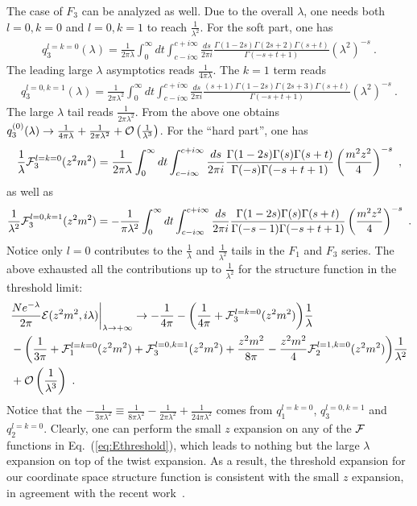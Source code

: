 \documentclass[a4paper,11pt]{article}
\begin{document}
The case of $F_3$ can be analyzed as well. Due to the overall $\lambda$, one needs both $l=0,k=0$ and $l=0,k=1$ to reach $\frac{1}{\lambda^2}$.  For the soft part, one has
\begin{align}
q_3^{l=k=0}(\lambda)=\frac{1}{2\pi\lambda}\int_{0}^{\infty} dt \int_{c-i\infty}^{c+i\infty} \frac{ds}{2\pi i}\frac{\Gamma (1-2 s)  \Gamma(2s+2)\Gamma (s+t)}{\Gamma (-s+t+1)}\left(\lambda^2\right)^{-s} \ .
\end{align}
The leading large $\lambda$ asymptotics reads $\frac{1}{4\pi \lambda}$. The $k=1$ term reads
\begin{align}
q_3^{l=0,k=1}(\lambda)=\frac{1}{2\pi\lambda^2}\int_{0}^{\infty} dt \int_{c-i\infty}^{c+i\infty} \frac{ds}{2\pi i}\frac{(s+1)\Gamma (1-2 s)  \Gamma(2s+3)\Gamma (s+t)}{\Gamma (-s+t+1)}\left(\lambda^2\right)^{-s} \ .
\end{align}
The large $\lambda$ tail reads $\frac{1}{2\pi \lambda^2}$. From the above one obtains $q_3^{(0)}(\lambda) \rightarrow \frac{1}{4\pi \lambda}+\frac{1}{2\pi \lambda^2}+{\cal O}\left(\frac{1}{\lambda^3}\right)$. 
For the ``hard part'', one has
\begin{align}
\frac{1}{\lambda}{\cal F}_3^{l=k=0}(z^2m^2)=\frac{1}{2\pi\lambda}\int_{0}^{\infty} dt \int_{c-i\infty}^{c+i\infty} \frac{ds}{2\pi i}\frac{\Gamma (1-2 s) \Gamma (s) \Gamma (s+t)}{\Gamma (-s) \Gamma (-s+t+1)}\left(\frac{m^2 z^2}{4}\right)^{-s} \ ,
\end{align}
as well as
\begin{align}
\frac{1}{\lambda^2}{\cal F}_3^{l=0,k=1}(z^2m^2)=-\frac{1}{\pi\lambda^2}\int_{0}^{\infty} dt \int_{c-i\infty}^{c+i\infty} \frac{ds}{2\pi i}\frac{\Gamma (1-2 s) \Gamma (s) \Gamma (s+t)}{\Gamma (-s-1) \Gamma (-s+t+1)}\left(\frac{m^2 z^2}{4}\right)^{-s} \ .
\end{align}
Notice only $l=0$ contributes to the $\frac{1}{\lambda}$ and $\frac{1}{\lambda^2}$ tails in the $F_1$ and $F_3$ series. The above exhausted all the contributions up to $\frac{1}{\lambda^2}$ for the structure function in the threshold limit: 
\begin{align}\label{eq:Ethreshold}
&\frac{Ne^{-\lambda}}{2\pi}{\cal E}(z^2m^2,i\lambda)\bigg|_{\lambda \rightarrow +\infty} \rightarrow -\frac{1}{4\pi}-\bigg(\frac{1}{4\pi}+{\cal F}^{l=k=0}_3(z^2m^2)\bigg)\frac{1}{\lambda}\nonumber \\ 
&-\bigg(\frac{1}{3\pi}+{\cal F}_1^{l=k=0}(z^2m^2)+{\cal F}_3^{l=0,k=1}(z^2m^2)+\frac{z^2m^2}{8\pi}-\frac{z^2m^2}{4}{\cal F}_2^{l=1,k=0}(z^2m^2)\bigg)\frac{1}{\lambda^2} \nonumber \\ 
&+{\cal O}\left(\frac{1}{\lambda^3}\right) \ .
\end{align}
Notice that the $-\frac{1}{3\pi \lambda^2}\equiv \frac{1}{8\pi \lambda^2}-\frac{1}{2\pi \lambda^2}+\frac{1}{24\pi \lambda^2}$ comes from 
$q_1^{l=k=0}$, $q_3^{l=0,k=1}$ and $q_2^{l=k=0}$.
Clearly, one can perform the small $z$ expansion on any of the ${\cal F}$ functions in Eq.~(\ref{eq:Ethreshold}), which leads to nothing but the large $\lambda$ expansion on top of the twist expansion. As a result, the threshold expansion for our coordinate space structure function  is consistent with the small $z$ expansion, in agreement with the recent work~\cite{Liu:2023onm}. 
\end{document}

